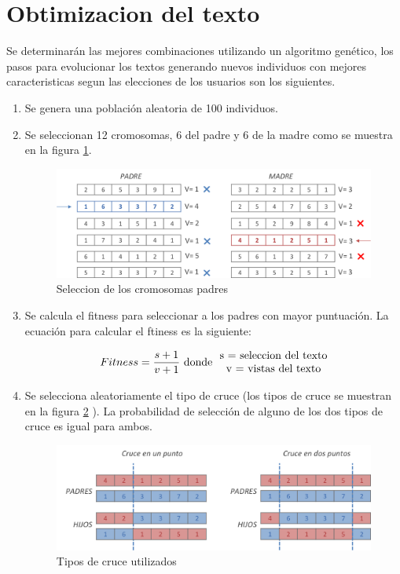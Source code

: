 \section{Obtimizacion del texto}

Se determinarán las mejores combinaciones utilizando un algoritmo genético, los pasos para evolucionar los textos generando nuevos individuos con mejores caracteristicas segun las elecciones de los usuarios son los siguientes.

\begin{enumerate}[\hspace*{0.5cm} P{a}so 1]
\item Se genera una población aleatoria de 100 individuos.
\item Se seleccionan 12 cromosomas, 6 del padre y 6 de la madre como se muestra en la figura \ref{padres}.

\begin{figure}[htp]
  \centerline{\includegraphics[width=6in]{padres.png}} 
  \caption{Seleccion de los cromosomas padres} 
\label{padres}
\end{figure}

\item Se calcula el fitness para seleccionar a los padres con mayor puntuación. La ecuación para calcular el ftiness es la siguiente:

\begin{equation}
Fitness = \frac{s+1 }{v+1 }   \textup{ donde }   \begin{matrix} \textup{ s = seleccion del texto} \\ \textup{ v = vistas del texto}\end{matrix}
\end{equation}

\item Se selecciona aleatoriamente  el tipo de cruce (los tipos de cruce se muestran en la figura \ref{cruce} ). La probabilidad de selección de alguno de los dos tipos de cruce es igual para ambos.

\begin{figure}[htp]
  \centerline{\includegraphics[width=6in]{cruce.png}} 
  \caption{Tipos de cruce utilizados} 
\label{cruce}
\end{figure}


\end{enumerate}
